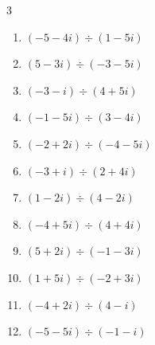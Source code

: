 \begin{multicols}{3}
\begin{enumerate}
  \item $\displaystyle (-5-4i)\div(1-5i)$


  \item $\displaystyle (5-3i)\div(-3-5i)$

        \phantom{$\displaystyle =i$}

  \item $\displaystyle (-3-i)\div(4+5i)$


  \item $\displaystyle (-1-5i)\div(3-4i)$


  \item $\displaystyle (-2+2i)\div(-4-5i)$


  \item $\displaystyle (-3+i)\div(2+4i)$


  \item $\displaystyle (1-2i)\div(4-2i)$


  \item $\displaystyle (-4+5i)\div(4+4i)$


  \item $\displaystyle (5+2i)\div(-1-3i)$


\columnbreak %

  \item $\displaystyle (1+5i)\div(-2+3i)$

        \phantom{$\displaystyle =1-i$}

  \item $\displaystyle (-4+2i)\div(4-i)$


  \item $\displaystyle (-5-5i)\div(-1-i)$


\end{enumerate}
\end{multicols}
